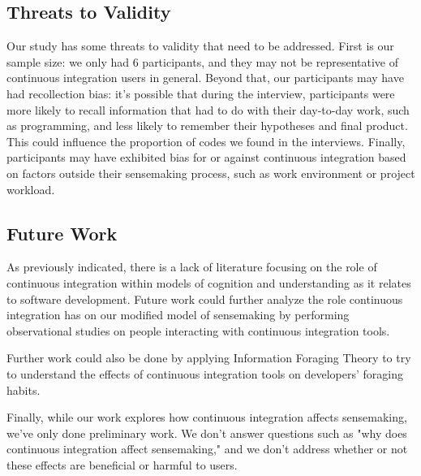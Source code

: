 \documentclass{sig-alternate}
\begin{document}
\subsection{Threats to Validity}
Our study has some threats to validity that need to be addressed. First is our sample size: we only had 6 participants, and they may not be representative of continuous integration users in general. Beyond that, our participants may have had recollection bias: it's possible that during the interview, participants were more likely to recall information that had to do with their day-to-day work, such as programming, and less likely to remember their hypotheses and final product. This could influence the proportion of codes we found in the interviews. Finally, participants may have exhibited bias for or against continuous integration based on factors outside their sensemaking process, such as work environment or project workload.
\subsection{Future Work}
As previously indicated, there is a lack of literature focusing on the role of continuous integration within models of cognition and understanding as it relates to software development. Future work could further analyze the role continuous integration has on our modified model of sensemaking by performing observational studies on people interacting with continuous integration tools. 

Further work could also be done by applying Information Foraging Theory to try to understand the effects of continuous integration tools on developers' foraging habits. 

Finally, while our work explores how continuous integration affects sensemaking, we've only done preliminary work. We don't answer questions such as "why does continuous integration affect sensemaking," and we don't address whether or not these effects are beneficial or harmful to users. 
\end{document}
